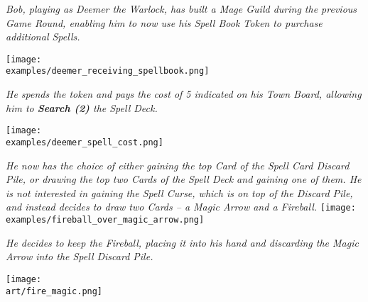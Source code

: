 \begin{multicols*}{2}

\textit{Bob, playing as Deemer the Warlock, has built a Mage Guild during the previous Game Round, enabling him to now use his Spell Book Token to purchase additional Spells.}

\texttt{[image: \\examples/deemer\_receiving\_spellbook.png]}\par
\textit{He spends the token and pays the cost of 5  indicated on his Town Board, allowing him to \textbf{Search (2)} the Spell Deck.}\par
\texttt{[image: \\examples/deemer\_spell\_cost.png]}\par
\filbreak
\textit{He now has the choice of either gaining the top Card of the Spell Card Discard Pile, or drawing the top two Cards of the Spell Deck and gaining one of them.
He is not interested in gaining the Spell Curse, which is on top of the Discard Pile, and instead decides to draw two Cards – a Magic Arrow and a Fireball.}
\texttt{[image: \\examples/fireball\_over\_magic\_arrow.png]}\par
\textit{He decides to keep the Fireball, placing it into his hand and discarding the Magic Arrow into the Spell Discard Pile.}

\vspace*{\fill}

\hfill{\texttt{[image: \\art/fire\_magic.png]}}

\end{multicols*}
